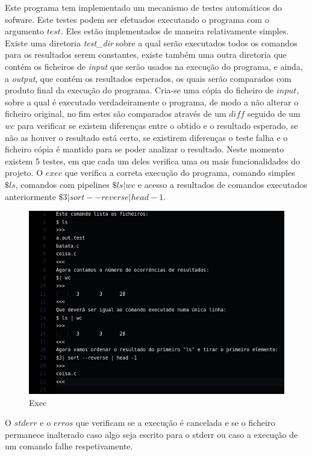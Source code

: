 \documentclass[a4paper]{article}
\begin{document}
Este programa tem implementado um mecanismo de testes automáticos do sofware.
Este testes podem ser efetuados executando o programa com o argumento $test$.
Eles estão implementados de maneira relativamente simples. Existe uma diretoria
\emph{test\_dir} sobre a qual serão executados todos os comandos para os
resultados serem constantes, existe também uma outra diretoria que contém os
ficheiros de \emph{input} que serão usados na execução do programa, e ainda, a
\emph{output}, que contém os resultados esperados, os quais serão comparados
com produto final da execução do programa.
Cria-se uma cópia do ficheiro de $input$, sobre a qual é executado
verdadeiramente o programa, de modo a não alterar o ficheiro original, no fim
estes são comparados através de um $diff$ seguido de um $wc$ para verificar se
existem diferenças entre o obtido e o resultado esperado, se não as houver o
resultado está certo, se existirem diferenças o teste falha e o ficheiro cópia
é mantido para se poder analizar o resultado.
Neste momento existem 5 testes, em que cada um deles verifica uma ou mais
funcionalidades do projeto. O $exec$ que verifica a correta execução do
programa, comando simples $\$ ls$, comandos com pipelines $\$ls | wc$ e acesso
a resultados de comandos executados anteriormente
$\$3| sort --reverse | head -1$.

\begin{figure}[H]
\centering
\includegraphics[scale=0.35]{imgs/exec.png}
\caption{Exec}
\label{img:Exec}
\end{figure}

O $stderr$ e o $erros$ que verificam se a
execução é cancelada e se o ficheiro permanece inalterado caso algo seja
escrito para o stderr ou caso a execução de um comando falhe respetivamente.
\end{document}
